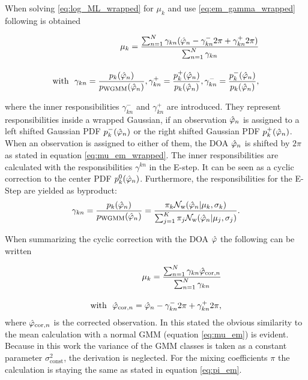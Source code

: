 When solving \ref{eq:log_ML_wrapped} for $\mu_k$ and use \ref{eq:em_gamma_wrapped} following is obtained

\begin{equation}
\begin{split}
\mu_k=\frac{\sum^{N}_{n=1}\gamma_{kn}(\hat{\varphi}_n-\gamma^-_{kn}2\pi+\gamma^+_{kn}2\pi)}{\sum^{N}_{n=1}\gamma_{kn}}\\[1em]
\text{with }\ \gamma_{kn}=\frac{p_k(\hat{\varphi}_n)}{p_\text{WGMM}(\hat{\varphi}_n)}, \gamma^+_{kn}=\frac{p^+_k(\hat{\varphi}_n)}{p_k(\hat{\varphi}_n)}, \gamma^-_{kn}=\frac{p^-_k(\hat{\varphi}_n)}{p_k(\hat{\varphi}_n)},
\label{eq:mu_em_wrapped}
\end{split}
\end{equation}

where the inner responsibilities $\gamma^-_{kn}$ and $\gamma^+_{kn}$ are introduced. They represent responsibilities inside a wrapped Gaussian, if an observation $\hat{\varphi}_n$ is assigned to a left shifted Gaussian \ac{PDF} $p^-_k(\hat{\varphi}_n)$ or the right shifted Gaussian \ac{PDF} $p^+_k(\hat{\varphi}_n)$. When an observation is assigned to either of them, the \ac{DOA} $\hat{\varphi}_n$ is shifted by $2\pi$ as stated in equation \ref{eq:mu_em_wrapped}. The inner responsibilities are calculated with the responsibilities $\gamma^{kn}$ in the E-step.
It can be seen as a cyclic correction to the center \ac{PDF} $p^0_k(\hat{\varphi}_n)$.
Furthermore, the responsibilities for the E-Step are yielded as byproduct:
\begin{equation}
\gamma_{kn} = \frac{p_k(\hat{\varphi}_n)}{p_\text{WGMM}(\hat{\varphi}_n)}= \frac{\pi_k \mathcal{N}_\text{w}(\hat{\varphi}_n|\mu_k,\sigma_k)}{\sum^K_{j=1} \pi_j\mathcal{N}_\text{w}(\hat{\varphi}_n|\mu_j,\sigma_j)} .
\label{eq:em_gamma_wrapped}
\end{equation}

When summarizing the cyclic correction with the \ac{DOA} $\hat{\varphi}$ the following can be written

\begin{equation}
\begin{split}
\mu_k=\frac{\sum^{N}_{n=1}\gamma_{kn}\hat{\varphi}_{\text{cor},n}}{\sum^N_{n=1}\gamma_{kn}}\\[1em]
\text{with }\ \hat{\varphi}_{\text{cor},n} = \hat{\varphi}_n-\gamma^-_{kn}2\pi+\gamma^+_{kn}2\pi,
\end{split}
\end{equation}
where $\hat{\varphi}_{\text{cor},n}$ is the corrected observation. In this stated the obvious similarity to the mean calculation with a normal \ac{GMM} (equation \ref{eq:mu_em}) is evident.\\
Because in this work the variance of the \ac{GMM} classes is taken as a constant parameter $\sigma^2_\text{const}$, the derivation is neglected. For the mixing coefficients $\pi$ the calculation is staying the same as stated in equation \ref{eq:pi_em}.



